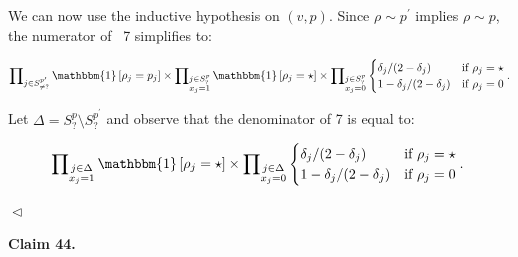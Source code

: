 \documentclass[10pt,a4paper]{article}
\begin{document}
We can now use the inductive hypothesis on $(v,p)$. Since $\rho\sim p^{\prime}$ implies $\rho\sim p$, the numerator of  7 simplifies to:\par


\[\begin{gathered}
\prod\nolimits_{j\in S^{p^{\prime}}_{\neq\mathord{?}}}\mathbbm{1}\left[\rho_{j}=p_{j}\right]\times\prod\nolimits_{\begin{subarray}{c}j\in S^{p}_{\mathord{?}}\\
x_{j}=1\end{subarray}}\mathbbm{1}\left[\rho_{j}=\star\right]\times\prod\nolimits_{\begin{subarray}{c}j\in S^{p}_{\mathord{?}}\\
x_{j}=0\end{subarray}}\begin{cases}\delta_{j}/(2-\delta_{j})&\textup{if $\rho_{j}=\star$}\\
1-\delta_{j}/(2-\delta_{j})&\textup{if $\rho_{j}=0$}\end{cases}.
\end{gathered}\]


Let $\Delta=S^{p}_{\mathord{?}}\setminus S^{p^{\prime}}_{\mathord{?}}$ and observe that the denominator of  7 is equal to:\par


\[\begin{gathered}
\prod\nolimits_{\begin{subarray}{c}j\in\Delta\\
x_{j}=1\end{subarray}}\mathbbm{1}\left[\rho_{j}=\star\right]\times\prod\nolimits_{\begin{subarray}{c}j\in\Delta\\
x_{j}=0\end{subarray}}\begin{cases}\delta_{j}/(2-\delta_{j})&\textup{if $\rho_{j}=\star$}\\
1-\delta_{j}/(2-\delta_{j})&\textup{if $\rho_{j}=0$}\end{cases}.\
\end{gathered}\]


$\vartriangleleft$\par





\par\medskip\noindent\textbf{
Claim 44. 
}\par
\end{document}
